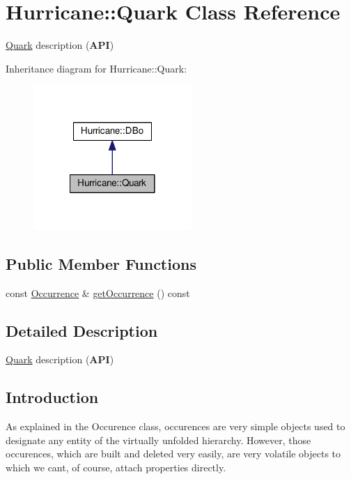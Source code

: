 \hypertarget{classHurricane_1_1Quark}{}\section{Hurricane\+:\+:Quark Class Reference}
\label{classHurricane_1_1Quark}


\mbox{\hyperlink{classHurricane_1_1Quark}{Quark}} description ({\bfseries A\+PI})  




Inheritance diagram for Hurricane\+:\+:Quark\+:\nopagebreak
\begin{figure}[H]
\begin{center}
\leavevmode
\includegraphics[width=170pt]{classHurricane_1_1Quark__inherit__graph}
\end{center}
\end{figure}
\subsection*{Public Member Functions}
\begin{DoxyCompactItemize}
\item 
const \mbox{\hyperlink{classHurricane_1_1Occurrence}{Occurrence}} \& \mbox{\hyperlink{classHurricane_1_1Quark_a22ee192574dae1546ec17d6c549b2ca0}{get\+Occurrence}} () const
\end{DoxyCompactItemize}


\subsection{Detailed Description}
\mbox{\hyperlink{classHurricane_1_1Quark}{Quark}} description ({\bfseries A\+PI}) 

\hypertarget{classHurricane_1_1Quark_secQuarkIntro}{}\subsection{Introduction}\label{classHurricane_1_1Quark_secQuarkIntro}
As explained in the Occurence class, occurences are very simple objects used to designate any entity of the virtually unfolded hierarchy. However, those occurences, which are built and deleted very easily, are very volatile objects to which we can\textquotesingle{}t, of course, attach properties directly.

